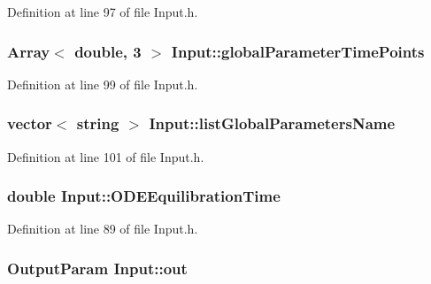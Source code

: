\-Definition at line 97 of file \-Input.\-h.

\hypertarget{class_input_a86be833bf32a0e6e5deec8da213e7e6f}{
\subsubsection[{global\-Parameter\-Time\-Points}]{\setlength{\rightskip}{0pt plus 5cm}\-Array$<$ double, 3 $>$ {\bf \-Input\-::global\-Parameter\-Time\-Points}}}\label{class_input_a86be833bf32a0e6e5deec8da213e7e6f}


\-Definition at line 99 of file \-Input.\-h.

\hypertarget{class_input_ab6ad759b315761a306fd95353b31c1a4}{
\subsubsection[{list\-Global\-Parameters\-Name}]{\setlength{\rightskip}{0pt plus 5cm}vector$<$ string $>$ {\bf \-Input\-::list\-Global\-Parameters\-Name}}}\label{class_input_ab6ad759b315761a306fd95353b31c1a4}


\-Definition at line 101 of file \-Input.\-h.

\hypertarget{class_input_ad9902e799cfa4f3b81a9693448ae113f}{
\subsubsection[{\-O\-D\-E\-Equilibration\-Time}]{\setlength{\rightskip}{0pt plus 5cm}double {\bf \-Input\-::\-O\-D\-E\-Equilibration\-Time}}}\label{class_input_ad9902e799cfa4f3b81a9693448ae113f}


\-Definition at line 89 of file \-Input.\-h.

\hypertarget{class_input_a4efa8e11da83057d1a7a7b828033438d}{
\subsubsection[{out}]{\setlength{\rightskip}{0pt plus 5cm}\-Output\-Param {\bf \-Input\-::out}}}\label{class_input_a4efa8e11da83057d1a7a7b828033438d}


